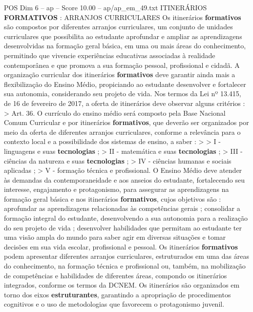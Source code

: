 \begin{textsample}{POS Dim 6 – ap – Score 10.00 – ap/ap\_em\_49.txt}  \label{ex:f6_pos_105}
ITINERÁRIOS \textbf{FORMATIVOS} : ARRANJOS CURRICULARES Os itinerários \textbf{formativos} são compostos por diferentes arranjos curriculares, um conjunto de unidades curriculares que possibilita ao estudante aprofundar e ampliar as aprendizagens desenvolvidas na formação geral básica, em uma ou mais áreas do conhecimento, permitindo que vivencie experiências educativas associadas à realidade contemporânea e que promova a sua formação pessoal, profissional e cidadã.
A organização curricular dos itinerários \textbf{formativos} deve garantir ainda mais a flexibilização do Ensino Médio, propiciando ao estudante desenvolver e fortalecer sua autonomia, considerando seu projeto de vida.
Nos termos da Lei nº 13.415, de 16 de fevereiro de 2017, a oferta de itinerários deve observar alguns critérios : > Art. 36.
O currículo do ensino médio será composto pela Base Nacional Comum Curricular e por itinerários \textbf{formativos}, que deverão ser organizados por meio da oferta de diferentes arranjos curriculares, conforme a relevância para o contexto local e a possibilidade dos sistemas de ensino, a saber : > > I - linguagens e suas \textbf{tecnologias} ; > II - matemática e suas \textbf{tecnologias} ; > III - ciências da natureza e suas \textbf{tecnologias} ; > IV - ciências humanas e sociais aplicadas ; > V - formação técnica e profissional.
O Ensino Médio deve atender às demandas da contemporaneidade e aos anseios do estudante, fortalecendo seu interesse, engajamento e protagonismo, para assegurar as aprendizagens na formação geral básica e nos itinerários \textbf{formativos}, cujos objetivos são : aprofundar as aprendizagens relacionadas às competências gerais ; consolidar a formação integral do estudante, desenvolvendo a sua autonomia para a realização do seu projeto de vida ; desenvolver habilidades que permitam ao estudante ter uma visão ampla do mundo para saber agir em diversas situações e tomar decisões em sua vida escolar, profissional e pessoal.
Os itinerários \textbf{formativos} podem apresentar diferentes arranjos curriculares, estruturados em uma das áreas do conhecimento, na formação técnica e profissional ou, também, na mobilização de competências e habilidades de diferentes áreas, compondo os itinerários integrados, conforme os termos da DCNEM.
Os itinerários são organizados em torno dos eixos \textbf{estruturantes}, garantindo a apropriação de procedimentos cognitivos e o uso de metodologias que favorecem o protagonismo juvenil.

\end{textsample}
